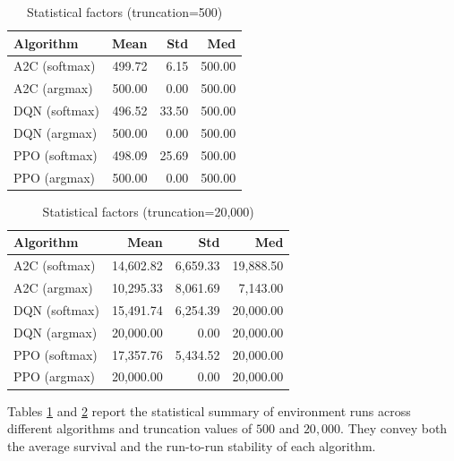\documentclass{article}
\theoremstyle{plain}
\theoremstyle{definition}
\theoremstyle{remark}
\begin{document}
\begin{table}[t]
\vskip 0.15in
\centering
\begin{small}
\begin{sc}
\caption{Statistical factors (truncation=500)}
\label{tab:results_summary_500}
\begin{tabular}{l r r r }
\toprule
\textbf{Algorithm} & \textbf{Mean} & \textbf{Std} & \textbf{Med}\\
\midrule
A2C (softmax) & 499.72 & 6.15  & 500.00 \\
A2C (argmax)  & 500.00 & 0.00  & 500.00 \\
DQN (softmax) & 496.52 & 33.50 & 500.00 \\
DQN (argmax)  & 500.00 & 0.00  & 500.00 \\
PPO (softmax) & 498.09 & 25.69 & 500.00 \\
PPO (argmax)  & 500.00 & 0.00  & 500.00 \\
\bottomrule
\end{tabular}
\end{sc}
\end{small}
\vskip -0.1in
\end{table}

\begin{table}[t]
\vskip 0.15in
\centering
\begin{small}
\begin{sc}
\caption{Statistical factors (truncation=20,000)}
\label{tab:results_summary_20000}
\begin{tabular}{l r r r}
\toprule
\textbf{Algorithm} & \textbf{Mean} & \textbf{Std} & \textbf{Med}\\
\midrule
A2C (softmax) & 14,602.82 & 6,659.33 & 19,888.50 \\
A2C (argmax)  & 10,295.33 & 8,061.69 & 7,143.00  \\
DQN (softmax) & 15,491.74 & 6,254.39 & 20,000.00 \\
DQN (argmax)  & 20,000.00 & 0.00     & 20,000.00 \\
PPO (softmax) & 17,357.76 & 5,434.52 & 20,000.00 \\
PPO (argmax)  & 20,000.00 & 0.00     & 20,000.00 \\
\bottomrule
\end{tabular}
\end{sc}
\end{small}
\vskip -0.1in
\end{table}


Tables \ref{tab:results_summary_500} and \ref{tab:results_summary_20000} report the statistical summary of environment runs across different algorithms and truncation values of $500$ and $20{,}000$. They convey both the average survival and the run-to-run stability of each algorithm.
\end{document}
